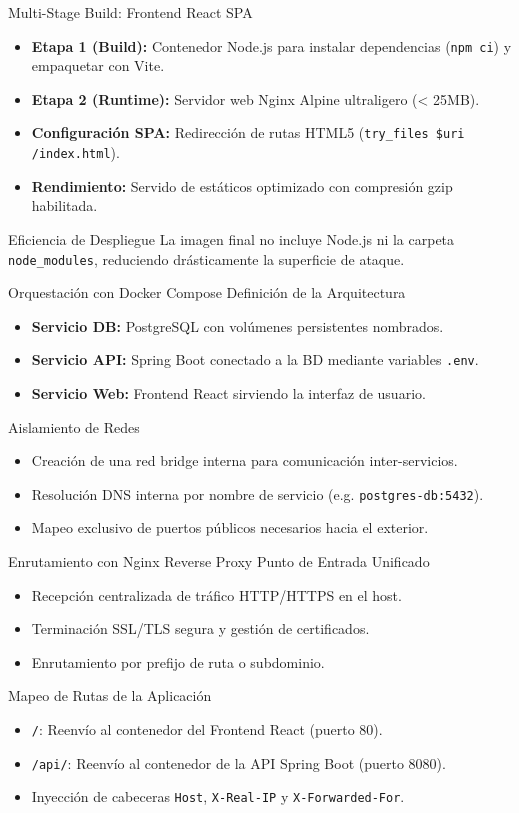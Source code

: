 \documentclass[aspectratio=169]{beamer}
\begin{document}
\contentSlideBulletCard
  {Multi-Stage Build: Frontend React SPA}
  {
    \begin{itemize}
      \item \textbf{Etapa 1 (Build):} Contenedor Node.js para instalar dependencias (\texttt{npm ci}) y empaquetar con Vite.
      \item \textbf{Etapa 2 (Runtime):} Servidor web Nginx Alpine ultraligero (< 25MB).
      \item \textbf{Configuración SPA:} Redirección de rutas HTML5 (\texttt{try\_files \$uri /index.html}).
      \item \textbf{Rendimiento:} Servido de estáticos optimizado con compresión gzip habilitada.
    \end{itemize}
  }
  {Eficiencia de Despliegue}
  {La imagen final no incluye Node.js ni la carpeta \texttt{node\_modules}, reduciendo drásticamente la superficie de ataque.}

\contentSlideTwoCols
  {Orquestación con Docker Compose}
  {Definición de la Arquitectura}
  {
    \begin{itemize}
      \item \textbf{Servicio DB:} PostgreSQL con volúmenes persistentes nombrados.
      \item \textbf{Servicio API:} Spring Boot conectado a la BD mediante variables \texttt{.env}.
      \item \textbf{Servicio Web:} Frontend React sirviendo la interfaz de usuario.
    \end{itemize}
  }
  {Aislamiento de Redes}
  {
    \begin{itemize}
      \item Creación de una red bridge interna para comunicación inter-servicios.
      \item Resolución DNS interna por nombre de servicio (e.g. \texttt{postgres-db:5432}).
      \item Mapeo exclusivo de puertos públicos necesarios hacia el exterior.
    \end{itemize}
  }

\contentSlideTwoCols
  {Enrutamiento con Nginx Reverse Proxy}
  {Punto de Entrada Unificado}
  {
    \begin{itemize}
      \item Recepción centralizada de tráfico HTTP/HTTPS en el host.
      \item Terminación SSL/TLS segura y gestión de certificados.
      \item Enrutamiento por prefijo de ruta o subdominio.
    \end{itemize}
  }
  {Mapeo de Rutas de la Aplicación}
  {
    \begin{itemize}
      \item \texttt{/}: Reenvío al contenedor del Frontend React (puerto 80).
      \item \texttt{/api/}: Reenvío al contenedor de la API Spring Boot (puerto 8080).
      \item Inyección de cabeceras \texttt{Host}, \texttt{X-Real-IP} y \texttt{X-Forwarded-For}.
    \end{itemize}
  }
\end{document}
